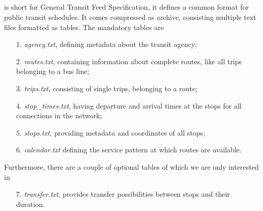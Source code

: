 \subsection{\gtfs}
	\gtfs {} is short for General Transit Feed Specification, it defines a common format
	for public transit schedules. It comes compressed as \zip archive, consisting multiple
	text files formatted as \csv tables. The mandatory tables are
	\begin{itemize}
		\item[1.] \textit{agency.txt}, defining metadata about the transit agency;
		\item[2.] \textit{routes.txt}, containing information about complete routes, like all trips belonging to a bus line;
		\item[3.] \textit{trips.txt}, consisting of single trips, belonging to a route;
		\item[4.] \textit{stop\_times.txt}, having departure and arrival times at the stops for all connections in the network;
		\item[5.] \textit{stops.txt}, providing metadata and coordinates of all stops;
		\item[6.] \textit{calendar.txt} defining the service pattern at which routes are available.
	\end{itemize}
	Furthermore, there are a couple of optional tables of which we are only interested in
	\begin{itemize}
		\item[7.] \textit{transfer.txt}, provides transfer possibilities between stops and their duration.
	\end{itemize}
